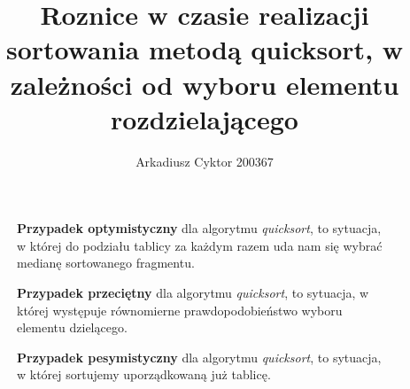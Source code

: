 \documentclass[a4paper,11pt]{report}
\title{Roznice w czasie realizacji sortowania metodą quicksort, w zależności od wyboru elementu rozdzielającego}
\author{Arkadiusz Cyktor 200367}
\begin{document}
\maketitle

\begin{figure}
\textbf{Przypadek optymistyczny} dla algorytmu \emph{quicksort}, to sytuacja, w której do podziału tablicy za każdym razem uda nam się wybrać medianę sortowanego fragmentu.
\end{figure}
\begin{figure}
\textbf{Przypadek przeciętny} dla algorytmu \emph{quicksort}, to sytuacja, w której występuje równomierne prawdopodobieństwo wyboru elementu dzielącego.
\end{figure}
\begin{figure}
\textbf{Przypadek pesymistyczny} dla algorytmu \emph{quicksort}, to sytuacja, w której sortujemy uporządkowaną już tablicę.
\end{figure}
\end{document}
